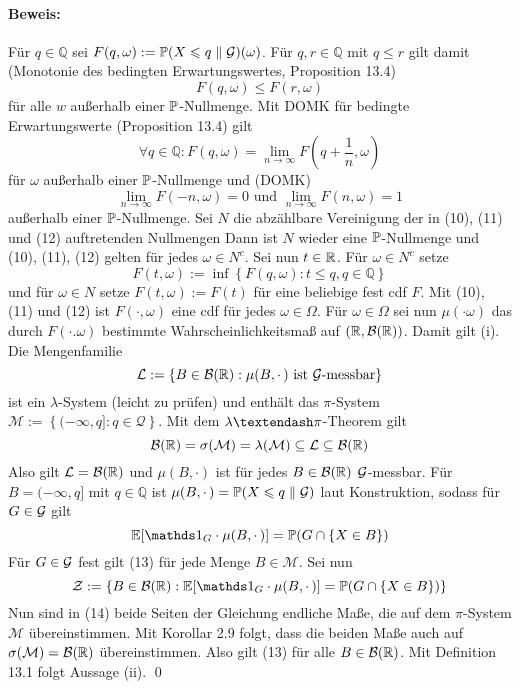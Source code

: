    \paragraph{Beweis:}F\"ur $q\in\mathbb{Q}$ sei $F(q,\omega):=\mathbb{P}(X\leqslant q\parallel\mathcal{G})(\omega)$. F\"ur $q,r\in\mathbb{Q}$ mit $q\leq r$ gilt damit (Monotonie des bedingten Erwartungswertes, Proposition 13.4)
    \begin{equation}
        F(q,\omega)\leq F(r,\omega)
    \end{equation}
    f\"ur alle $w$ außerhalb einer $\mathbb{P}$-Nullmenge. Mit DOMK f\"ur bedingte Erwartungswerte (Proposition 13.4) gilt
    \begin{equation}
        \forall q\in\mathbb{Q}:F(q,\omega)=\lim_{n\to\infty}F\left(q+\frac{1}{n},\omega\right)
    \end{equation}
    f\"ur $\omega$ außerhalb einer $\mathbb{P}$-Nullmenge und (DOMK)
    \begin{equation}
        \lim_{n\to\infty}F(-n,\omega)=0\text{ und }\lim_{n\to\infty}F(n,\omega)=1
    \end{equation}
    außerhalb einer $\mathbb{P}$-Nullmenge. Sei $N$ die abz\"ahlbare Vereinigung der in (10), (11) und (12) auftretenden Nullmengen Dann ist $N$ wieder eine $\mathbb{P}$-Nullmenge und (10), (11), (12) gelten f\"ur jedes $\omega\in N^c$.\newline\newline
    Sei nun $t\in\mathbb{R}$. F\"ur $\omega\in N^c$ setze
    $$F(t,\omega):=\inf\left\{F(q,\omega):t\leq q,q\in\mathbb{Q}\right\}$$
    und f\"ur $\omega\in N$ setze $F(t,\omega):=F(t)$ f\"ur eine beliebige fest cdf $F$. Mit (10), (11) und (12) ist $F(\cdotp,\omega)$ eine cdf f\"ur jedes $\omega\in\Omega$. F\"ur $\omega\in\Omega$ sei nun $\mu(\cdotp\omega)$ das durch $F(\cdotp.\omega)$ bestimmte Wahrscheinlichkeitsmaß auf $(\mathbb{R},\mathcal{B}(\mathbb{R}))$. Damit gilt (i). \newline\newline
    Die Mengenfamilie
    $$\mathcal{L}:=\left\{B\in\mathcal{B}(\mathbb{R}):\mu(B,\cdotp)\text{ ist }\mathcal{G}\text{-messbar}\right\}$$
    ist ein $\lambda$-System (leicht zu pr\"ufen) und enth\"alt das $\pi$-System $\mathcal{M}:=\left\{(-\infty,q]:q\in\mathcal{Q}\right\}$. Mit dem $\lambda\textendash\pi$-Theorem gilt
    $$\mathcal{B}(\mathbb{R})=\sigma(\mathcal{M})=\lambda(\mathcal{M})\subseteq\mathcal{L}\subseteq\mathcal{B}(\mathbb{R})$$
    Also gilt $\mathcal{L}=\mathcal{B}(\mathbb{R})$ und $\mu(B,\cdotp)$ ist f\"ur jedes $B\in\mathcal{B}(\mathbb{R})$ $\mathcal{G}$-messbar. \newline\newline
    F\"ur $B=(-\infty,q]$ mit $q\in\mathbb{Q}$ ist $\mu(B,\cdotp)=\mathbb{P}(X\leqslant q\parallel\mathcal{G})$ laut Konstruktion, sodass f\"ur $G\in\mathcal{G}$ gilt
    \begin{equation}
        \E[\ind{G}\cdot\mu(B,\cdotp)]=\Pp(G\cap\{X\in B\})
    \end{equation}
    F\"ur $G\in\mathcal{G}$ fest gilt (13) f\"ur jede Menge $B\in\mathcal{M}$. Sei nun 
    $$\mathcal{Z}:=\left\{B\in\borel:\E[\ind{G}\cdot\mu(B,\cdotp)]=\Pp(G\cap\{X\in B\})\right\}$$
    Nun sind in (14) beide Seiten der Gleichung endliche Maße, die auf dem $\pi$-System $\mathcal{M}$ \"ubereinstimmen. Mit Korollar 2.9 folgt, dass die beiden Maße auch auf $\sigma(\mathcal{M})=\mathcal{B}(\mathbb{R})$ \"ubereinstimmen. Also gilt (13) f\"ur alle $B\in\mathcal{B}(\mathbb{R})$. Mit Definition 13.1 folgt Aussage (ii). \qed
